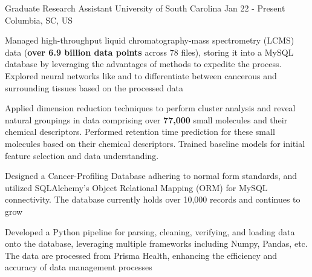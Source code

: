 
\vspace*{-0.2cm}

\begin{cventries}
    \cventry
        {Graduate Research Assistant} %
        {University of South Carolina} %
        {Jan 22 - Present}
        {Columbia, SC, US} %
        {
            \begin{cvitemsfree} %
                \item{Managed high-throughput liquid chromatography-mass spectrometry (LCMS) data (\textbf{over 6.9 billion data points} across 78 files), storing it into a MySQL database by leveraging the advantages of  methods to expedite the process. Explored neural networks like  and  to differentiate between cancerous and surrounding tissues based on the processed data}
                \item{Applied dimension reduction techniques  to perform cluster analysis and reveal natural groupings in data comprising over \textbf{77,000} small molecules and their chemical descriptors. Performed retention time prediction for these small molecules based on their chemical descriptors. Trained baseline models for initial feature selection and data understanding.}
                \item{Designed a Cancer-Profiling Database adhering to normal form standards, and utilized SQLAlchemy's Object Relational Mapping (ORM) for MySQL connectivity. The database currently holds over 10,000 records and continues to grow}
                \item{Developed a Python pipeline for parsing, cleaning, verifying, and loading data onto the database, leveraging multiple frameworks including Numpy, Pandas, etc. The data are processed from Prisma Health, enhancing the efficiency and accuracy of data management processes}

\end{cvitemsfree}}
\end{cventries}
